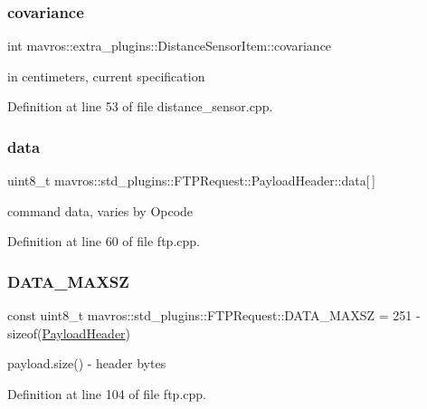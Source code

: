 \subsubsection{\texorpdfstring{covariance}{covariance}}
{\footnotesize\ttfamily int mavros\+::extra\+\_\+plugins\+::\+Distance\+Sensor\+Item\+::covariance}



in centimeters, current specification 



Definition at line 53 of file distance\+\_\+sensor.\+cpp.

\mbox{\label{group__plugin_gafd17454ffa66cafc1bf7b4a8d4b82961}} 
\subsubsection{\texorpdfstring{data}{data}}
{\footnotesize\ttfamily uint8\+\_\+t mavros\+::std\+\_\+plugins\+::\+F\+T\+P\+Request\+::\+Payload\+Header\+::data\mbox{[}$\,$\mbox{]}}



command data, varies by Opcode 



Definition at line 60 of file ftp.\+cpp.

\mbox{\label{group__plugin_gad25555fafe3a6aa0f078fec9099a6431}} 
\subsubsection{\texorpdfstring{DATA\_MAXSZ}{DATA\_MAXSZ}}
{\footnotesize\ttfamily const uint8\+\_\+t mavros\+::std\+\_\+plugins\+::\+F\+T\+P\+Request\+::\+D\+A\+T\+A\+\_\+\+M\+A\+X\+SZ = 251 -\/ sizeof(\mbox{\hyperlink{structmavros_1_1std__plugins_1_1FTPRequest_1_1PayloadHeader}{Payload\+Header}})\hspace{0.3cm}{\ttfamily [static]}}



payload.\+size() -\/ header bytes 



Definition at line 104 of file ftp.\+cpp.

\mbox{\label{group__plugin_ga4968be6fa6605fa70b81152e83bbef67}} 
